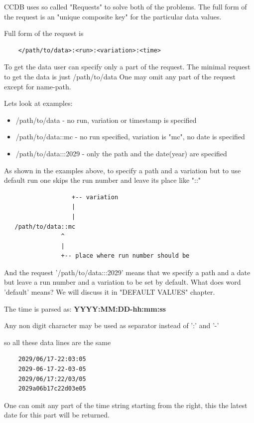 \documentclass{article}
\begin{document}
CCDB uses so called "Requests" to solve both of the problems.
The full form of  the request is an "unique composite key" for
the particular data values.

Full form of the request is
\begin{verbatim}
    </path/to/data>:<run>:<variation>:<time>
\end{verbatim}
\vspace{1 em}

To get the data user can specify only a part of the request.
The minimal request to get the data is just /path/to/data
One may omit any part of the request except for name-path.

Lets look at examples:
\begin{itemize}
\item /path/to/data - no run, variation or timestamp is specified
\item /path/to/data::mc - no run specified, variation is "mc", no date is specified
\item /path/to/data:::2029 - only the path and the date(year) are specified
\end{itemize}

As shown in the examples above, to specify a path and a variation but
to use default run one skips the run number and leave its place like "::"
\begin{verbatim}
                   +-- variation
                   |
                   |
   /path/to/data::mc
                ^
                |
                +-- place where run number should be
\end{verbatim}


And the request '/path/to/data:::2029' means that we specify a path and a date
but leave a run number and a variation to be set by default.
What does word 'default' means? We will discuss it in "DEFAULT VALUES" chapter.

The time is parsed as:
    \textbf{YYYY:MM:DD-hh:mm:ss}

Any non digit character may be used as separator instead of ':' and '-'

so all these data lines are the same
\begin{verbatim}
    2029/06/17-22:03:05
    2029-06-17-22-03-05
    2029/06/17:22/03/05
    2029a06b17c22d03e05
\end{verbatim}

One can omit any part of the time string starting from the right, this the 
latest date for this part will be returned.
\end{document}
